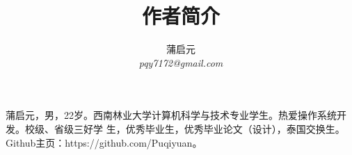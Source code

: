 \documentclass{wx672article} %
\title{作者简介}
\author{蒲启元 \\
\emph{pqy7172@gmail.com}}
\begin{document}
\maketitle{}

蒲启元，男，22岁。西南林业大学计算机科学与技术专业学生。热爱操作系统开发。校级、省级三好学
生，优秀毕业生，优秀毕业论文（设计），泰国交换生。Github主页：https://github.com/Puqiyuan。
\end{document}
